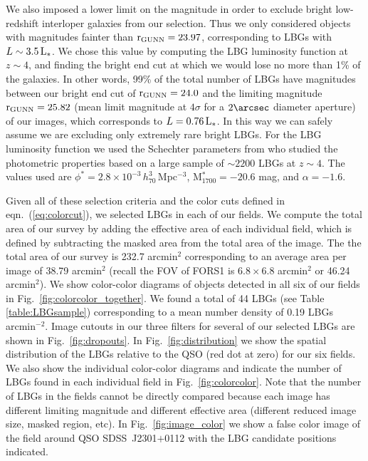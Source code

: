 \documentclass[iop, revtex4]{emulateapj}
\begin{document}
We also imposed a lower limit on the magnitude in order to exclude
bright low-redshift interloper galaxies from our selection.  Thus we
only considered objects with magnitudes fainter than $\rm r_{GUNN} =
23.97$, corresponding to LBGs with $L\sim3.5\,\rm L_{*}$. We chose
this value by computing the LBG luminosity function at $z\sim4$, and
finding the bright end cut at which we would lose no more than 1\% of
the galaxies. In other words, 99\% of the total number of LBGs have
magnitudes between our bright end cut of $\rm r_{GUNN} = 24.0$ and
the limiting magnitude $\rm r_{GUNN} = 25.82$ (mean limit magnitude at
$4\sigma$ for a $2\arcsec$ diameter aperture) of our images, which
corresponds to $L=0.76\,\rm L_{*}$. In this way we can safely assume
we are excluding only extremely rare bright LBGs.  For the LBG
luminosity function we used the Schechter parameters from
\citet{Ouchi04a} who studied the photometric properties based on a
large sample of $\sim 2200$ LBGs at $z\sim4$.
The values used are
$\phi^{*}=2.8\times10^{-3}\,h^{3}_{70}$\,Mpc$^{-3}$,
M$^{*}_{1700}=-20.6$ mag, and $\alpha = -1.6$.

Given all of these selection criteria and the color cuts defined in
eqn.~(\ref{eq:colorcut}), we selected LBGs in each of our
fields. We compute the total area of our survey by adding the
effective area of each individual field, which is defined by
subtracting the masked area from the total area of the image. The
the total area of our survey is 232.7 arcmin$^{2}$ corresponding to
an average area per image of 38.79 arcmin$^{2}$ (recall the FOV of
FORS1 is  $6.8\times6.8$ arcmin$^{2}$ or 46.24 arcmin$^{2}$). 
We show color-color diagrams of
objects detected in all six of our fields in Fig.~\ref{fig:colorcolor_together}.
We found a total of 44 LBGs (see
Table \ref{table:LBGsample}) corresponding to a mean number density of
0.19 LBGs arcmin$^{-2}$.
Image cutouts in our three filters for several of our selected LBGs 
are shown in Fig.~\ref{fig:dropouts}. In Fig.~\ref{fig:distribution} we show the spatial distribution of the LBGs relative to the QSO
(red dot at zero) for our six fields.
We also show the individual color-color diagrams and indicate the number of LBGs found in each
individual field in Fig.~\ref{fig:colorcolor}. Note that the number of LBGs in the fields
cannot be directly compared because each image has different limiting magnitude and different 
effective area (different reduced image size, masked region, etc).
In Fig.~\ref{fig:image_color} we show a false color image of the field around QSO
SDSS~J2301$+$0112 with the LBG candidate positions indicated.
\end{document}
